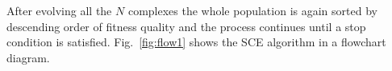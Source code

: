 After evolving all the $N$ complexes the whole population is again
sorted by descending order of fitness quality and the process continues until
a stop condition is satisfied.
Fig.~\ref{fig:flow1} shows the SCE algorithm in a flowchart diagram.

\begin{figure}[htp]
  ~
\end{figure}


